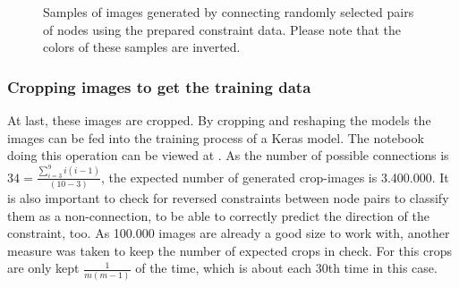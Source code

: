 \begin{figure}
\begin{subfigure}[b]{0.19\textwidth}
    \end{subfigure}
    \begin{subfigure}[b]{0.19\textwidth}
    \end{subfigure}
    \caption[Randomly connected nodes using constraint data]{Samples of images generated by connecting randomly selected pairs of nodes using the prepared constraint data. Please note that the colors of these samples are inverted.}\label{fig:constraint_data_step2}
\end{figure}

\subsubsection{Cropping images to get the training data}\label{ch:cropping_images}

At last, these images are cropped.
By cropping and reshaping the models the images can be fed into the training process of a Keras model.
The notebook doing this operation can be viewed at .
As the number of possible connections is \(34 = \frac{\sum_{i=3}^{9}i(i-1)}{(10-3)}\), the expected number of generated crop-images is 3.400.000.
It is also important to check for reversed constraints between node pairs to classify them as a non-connection, to be able to correctly predict the direction of the constraint, too.
As 100.000 images are already a good size to work with, another measure was taken to keep the number of expected crops in check.
For this crops are only kept \(\frac{1}{m(m-1)}\) of the time, which is about each 30th time in this case.

